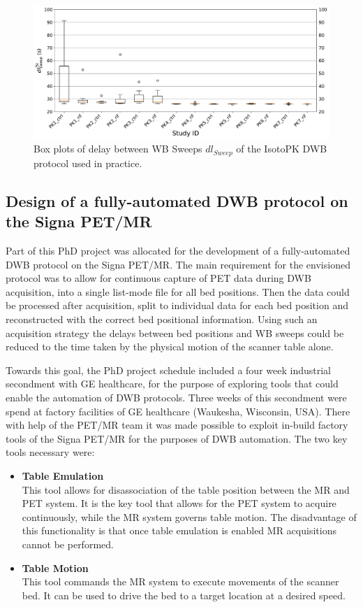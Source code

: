 %
\begin{figure} [ht!]
\centering
\includegraphics[scale=0.5,angle=0]{3_Results/3_1_DWB_Optimization/figures/3_1_BoxPlots_DTSweeps.pdf}
\caption{Box plots of delay between WB Sweeps $dl_{Sweep}$ of the IsotoPK DWB protocol used in practice.}
\label{fig3_1:BoxPlots_sweeps}
\end{figure}
%
%
%
\subsection{Design of a fully-automated DWB protocol on the Signa PET/MR}
Part of this PhD project was allocated for the development of a fully-automated DWB protocol on the Signa PET/MR. 
The main requirement for the envisioned protocol was to allow for continuous capture of PET data during DWB acquisition, into a single list-mode file for all bed positions. Then the data could be processed after acquisition, split to individual data for each bed position and reconstructed with the correct bed positional information. Using such an acquisition strategy the delays between bed positions and WB sweeps could be reduced to the time taken by the physical motion of the scanner table alone. 

Towards this goal, the PhD project schedule included a four week industrial secondment with GE healthcare, for the purpose of exploring tools that could enable the automation of DWB protocols. Three weeks of this secondment were spend at factory facilities of GE healthcare (Waukesha, Wisconsin, USA). %
There with help of the PET/MR team it was made possible to exploit in-build factory tools of the Signa PET/MR for the purposes of DWB automation. The two key tools necessary were: 
\begin{itemize}
    \item\textbf{Table Emulation} \\
    This tool allows for disassociation of the table position between the MR and PET system. It is the key tool that allows for the PET system to acquire continuously, while the MR system governs table motion. The disadvantage of this functionality is that once table emulation is enabled MR acquisitions cannot be performed.%
    \item\textbf{Table Motion} \\
    This tool commands the MR system to execute movements of the scanner bed. It can be used to drive the bed to a target location at a desired speed. 
\end{itemize}

